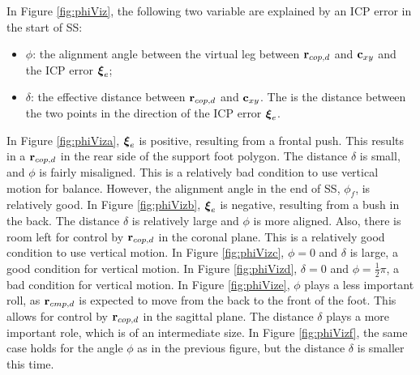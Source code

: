 In Figure \ref{fig:phiViz}, the following two variable are explained by an \ac{ICP} error in the start of \ac{SS}:
\begin{itemize}
	\item $\phi$: the alignment angle between the virtual leg between $\mathbf{r}_{cop,d}$ and $\mathbf{c}_{xy}$ and the \ac{ICP} error $\boldsymbol{\xi}_e$;
	\item $\delta$: the effective distance between $\mathbf{r}_{cop,d}$ and $\mathbf{c}_{xy}$. The is the distance between the two points in the direction of the \ac{ICP} error $\boldsymbol{\xi}_e$.
\end{itemize}
In Figure \ref{fig:phiViza}, $\boldsymbol{\xi}_e$ is positive, resulting from a frontal push. This results in a $\mathbf{r}_{cop,d}$ in the rear side of the support foot polygon. The distance $\delta$ is small, and $\phi$ is fairly misaligned. This is a relatively bad condition to use vertical motion for balance. However, the alignment angle in the end of \ac{SS}, $\phi_f$, is relatively good. In Figure \ref{fig:phiVizb}, $\boldsymbol{\xi}_e$ is negative, resulting from a bush in the back. The distance $\delta$ is relatively large and $\phi$ is more aligned.  Also, there is room left for control by $\mathbf{r}_{cop,d}$ in the coronal plane. This is a relatively good condition to use vertical motion. In Figure \ref{fig:phiVizc}, $\phi=0$ and $\delta$ is large, a good condition for vertical motion. In Figure \ref{fig:phiVizd}, $\delta=0$ and $\phi=\frac{1}{2}\pi$, a bad condition for vertical motion. In Figure \ref{fig:phiVize}, $\phi$ plays a less important roll, as $\mathbf{r}_{cmp,d}$ is expected to move from the back to the front of the foot. This allows for control by $\mathbf{r}_{cop,d}$ in the sagittal plane. The distance $\delta$ plays a more important role, which is of an intermediate size. In Figure \ref{fig:phiVizf}, the same case holds for the angle $\phi$ as in the previous figure, but the distance $\delta$ is smaller this time.  
